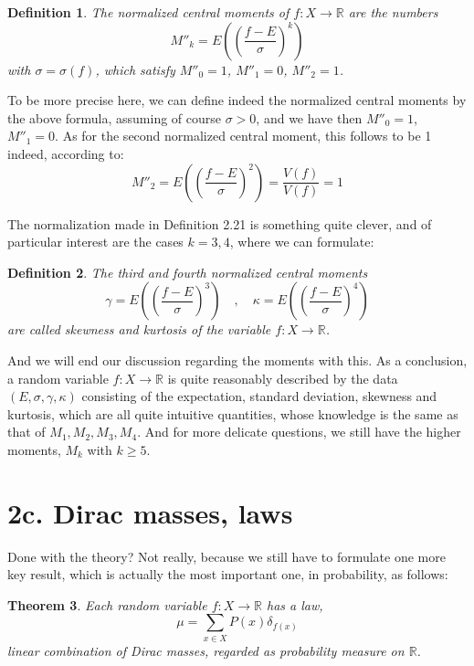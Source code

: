 \documentclass[12pt]{amsbook}
\newtheorem{theorem}{Theorem}[chapter]
\newtheorem{definition}[theorem]{Definition}
\begin{document}

\begin{definition}
The normalized central moments of $f:X\to\mathbb R$ are the numbers
$$M''_k=E\left(\left(\frac{f-E}{\sigma}\right)^k\right)$$
with $\sigma=\sigma(f)$, which satisfy $M''_0=1$, $M''_1=0$, $M''_2=1$.
\end{definition}

To be more precise here, we can define indeed the normalized central moments by the above formula, assuming of course $\sigma>0$, and we have then $M''_0=1$, $M''_1=0$. As for the second normalized central moment, this follows to be 1 indeed, according to:
$$M''_2=E\left(\left(\frac{f-E}{\sigma}\right)^2\right)=\frac{V(f)}{V(f)}=1$$

The normalization made in Definition 2.21 is something quite clever, and of particular interest are the cases $k=3,4$, where we can formulate:


\begin{definition}
The third and fourth normalized central moments
$$\gamma=E\left(\left(\frac{f-E}{\sigma}\right)^3\right)\quad,\quad 
\kappa=E\left(\left(\frac{f-E}{\sigma}\right)^4\right)$$
are called skewness and kurtosis of the variable $f:X\to\mathbb R$.
\end{definition}

And we will end our discussion regarding the moments with this. As a conclusion, a random variable $f:X\to\mathbb R$ is quite reasonably described by the data $(E,\sigma,\gamma,\kappa)$ consisting of the expectation, standard deviation, skewness and kurtosis, which are all quite intuitive quantities, whose knowledge is the same as that of $M_1,M_2,M_3,M_4$. And for more delicate questions, we still have the higher moments, $M_k$ with $k\geq5$.

\section*{2c. Dirac masses, laws} 

Done with the theory? Not really, because we still have to formulate one more key result, which is actually the most important one, in probability, as follows:


\begin{theorem}
Each random variable $f:X\to\mathbb R$ has a law,
$$\mu=\sum_{x\in X}P(x)\delta_{f(x)}$$
linear combination of Dirac masses, regarded as probability measure on $\mathbb R$.
\end{theorem} 
\end{document}
